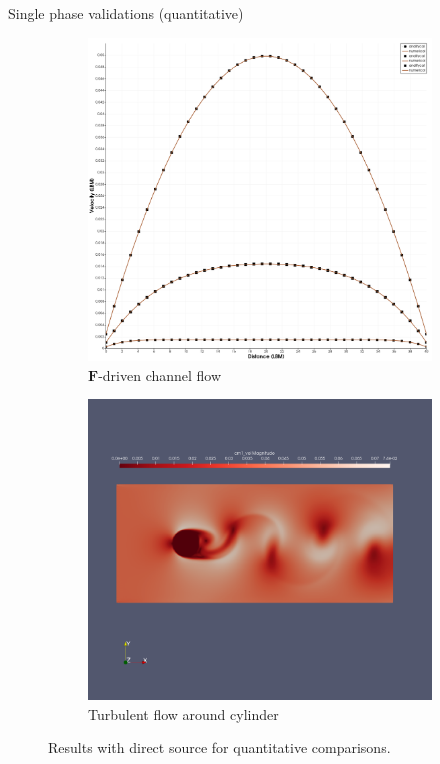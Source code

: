 \documentclass[8pt]{beamer}
\begin{document}
	\begin{frame}{Single phase validations (quantitative)}
		\begin{figure}[h]
			\centering
			\begin{subfigure}{.5\textwidth}
				\centering
				\includegraphics[width=.9\linewidth]{pics/channelForceDrivenValidation.png}
				\caption{$\mathbf{F}$-driven channel flow}
				\label{fig:sub1}
			\end{subfigure}%
			\begin{subfigure}{.5\textwidth}
				\centering
				\includegraphics[width=.9\linewidth]{pics/cylinderTurbulent.png}
				\caption{Turbulent flow around cylinder}
				\label{fig:sub2}
			\end{subfigure}
			\caption{Results with direct source for quantitative comparisons.}
			\label{fig:osci}
		\end{figure}
	\end{frame}
	
\end{document}
